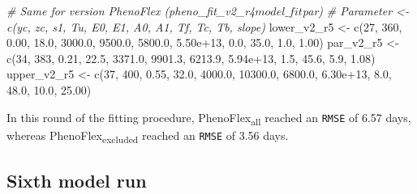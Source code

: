 \documentclass[
]{article}
\newenvironment{Shaded}{\begin{snugshade}}{\end{snugshade}}
\newcommand{\CommentTok}[1]{\textcolor[rgb]{0.56,0.35,0.01}{\textit{#1}}}
\newcommand{\DecValTok}[1]{\textcolor[rgb]{0.00,0.00,0.81}{#1}}
\newcommand{\FloatTok}[1]{\textcolor[rgb]{0.00,0.00,0.81}{#1}}
\newcommand{\FunctionTok}[1]{\textcolor[rgb]{0.00,0.00,0.00}{#1}}
\newcommand{\NormalTok}[1]{#1}
\newcommand{\OtherTok}[1]{\textcolor[rgb]{0.56,0.35,0.01}{#1}}
\begin{document}
\begin{Shaded}
\begin{Highlighting}[]
\CommentTok{\# Same for version PhenoFlex (pheno\_fit\_v2\_r4$model\_fit$par)}
\CommentTok{\# Parameter \textless{}{-} c(yc,  zc,   s1,   Tu,     E0,      E1,     A0,       A1,   Tf,   Tc,   Tb, slope)}
\NormalTok{lower\_v2\_r5 }\OtherTok{\textless{}{-}} \FunctionTok{c}\NormalTok{(}\DecValTok{27}\NormalTok{, }\DecValTok{360}\NormalTok{, }\FloatTok{0.00}\NormalTok{, }\FloatTok{18.0}\NormalTok{, }\FloatTok{3000.0}\NormalTok{,  }\FloatTok{9500.0}\NormalTok{, }\FloatTok{5800.0}\NormalTok{, }\FloatTok{5.50e+13}\NormalTok{,  }\FloatTok{0.0}\NormalTok{, }\FloatTok{35.0}\NormalTok{,  }\FloatTok{1.0}\NormalTok{,  }\FloatTok{1.00}\NormalTok{)}
\NormalTok{par\_v2\_r5   }\OtherTok{\textless{}{-}} \FunctionTok{c}\NormalTok{(}\DecValTok{34}\NormalTok{, }\DecValTok{383}\NormalTok{, }\FloatTok{0.21}\NormalTok{, }\FloatTok{22.5}\NormalTok{, }\FloatTok{3371.0}\NormalTok{,  }\FloatTok{9901.3}\NormalTok{, }\FloatTok{6213.9}\NormalTok{, }\FloatTok{5.94e+13}\NormalTok{,  }\FloatTok{1.5}\NormalTok{, }\FloatTok{45.6}\NormalTok{,  }\FloatTok{5.9}\NormalTok{,  }\FloatTok{1.08}\NormalTok{)}
\NormalTok{upper\_v2\_r5 }\OtherTok{\textless{}{-}} \FunctionTok{c}\NormalTok{(}\DecValTok{37}\NormalTok{, }\DecValTok{400}\NormalTok{, }\FloatTok{0.55}\NormalTok{, }\FloatTok{32.0}\NormalTok{, }\FloatTok{4000.0}\NormalTok{, }\FloatTok{10300.0}\NormalTok{, }\FloatTok{6800.0}\NormalTok{, }\FloatTok{6.30e+13}\NormalTok{,  }\FloatTok{8.0}\NormalTok{, }\FloatTok{48.0}\NormalTok{, }\FloatTok{10.0}\NormalTok{, }\FloatTok{25.00}\NormalTok{)}
\end{Highlighting}
\end{Shaded}

In this round of the fitting procedure, PhenoFlex\textsubscript{all}
reached an \texttt{RMSE} of 6.57 days, whereas
PhenoFlex\textsubscript{excluded} reached an \texttt{RMSE} of 3.56 days.

\hypertarget{sixth-model-run}{%
\subsection{Sixth model run}\label{sixth-model-run}}
\end{document}
